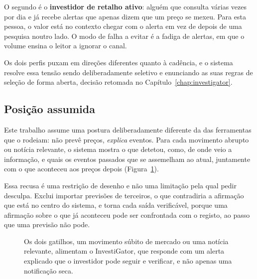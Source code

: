 O segundo é o \textbf{investidor de retalho ativo}: alguém que consulta várias vezes por dia e já
recebe alertas que apenas dizem que um preço se mexeu. Para esta pessoa, o valor está no contexto
chegar com o alerta em vez de depois de uma pesquisa noutro lado. O modo de falha a evitar é a
fadiga de alertas, em que o volume ensina o leitor a ignorar o canal.

Os dois perfis puxam em direções diferentes quanto à cadência, e o sistema resolve essa tensão
sendo deliberadamente seletivo e enunciando as suas regras de seleção de forma aberta, decisão
retomada no Capítulo~\ref{chap:investigator}.

\subsection*{Posição assumida}

Este trabalho assume uma postura deliberadamente diferente da das ferramentas que o rodeiam: não
prevê preços, \emph{explica} eventos. Para cada movimento abrupto ou notícia relevante, o sistema
mostra o que detetou, como, de onde veio a informação, e quais os eventos passados que se assemelham
ao atual, juntamente com o que aconteceu aos preços depois (Figura~\ref{fig:concept}).

Essa recusa é uma restrição de desenho e não uma limitação pela qual pedir desculpa. Exclui importar
previsões de terceiros, o que contradiria a afirmação que está no centro do sistema, e torna cada
saída verificável, porque uma afirmação sobre o que já aconteceu pode ser confrontada com o registo,
ao passo que uma previsão não pode.

\begin{figure}[ht]
\centering
{}
\caption[O que o InvestiGator faz]{Os dois gatilhos, um movimento súbito de mercado ou uma notícia
relevante, alimentam o InvestiGator, que responde com um alerta explicado que o investidor pode seguir e
verificar, e não apenas uma notificação seca.}
\label{fig:concept}
\end{figure}

